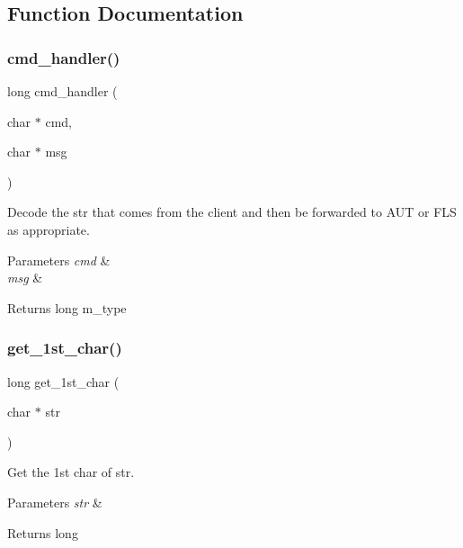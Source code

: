 \subsection{Function Documentation}
\mbox{\label{server_8c_a9fab57195d50c5f2b55f2744232ad64d}} 
\subsubsection{cmd\+\_\+handler()}
{\footnotesize\ttfamily long cmd\+\_\+handler (\begin{DoxyParamCaption}\item[{char $\ast$}]{cmd,  }\item[{char $\ast$}]{msg }\end{DoxyParamCaption})}



Decode the str that comes from the client and then be forwarded to A\+UT or F\+LS as appropriate. 


\begin{DoxyParams}{Parameters}
{\em cmd} & \\
\hline
{\em msg} & \\
\hline
\end{DoxyParams}
\begin{DoxyReturn}{Returns}
long m\+\_\+type 
\end{DoxyReturn}
\mbox{\label{server_8c_a224345045f1250d5768d42d8cc9e3dab}} 
\subsubsection{get\+\_\+1st\+\_\+char()}
{\footnotesize\ttfamily long get\+\_\+1st\+\_\+char (\begin{DoxyParamCaption}\item[{char $\ast$}]{str }\end{DoxyParamCaption})}



Get the 1st char of str. 


\begin{DoxyParams}{Parameters}
{\em str} & \\
\hline
\end{DoxyParams}
\begin{DoxyReturn}{Returns}
long 
\end{DoxyReturn}
\mbox{\label{server_8c_a7c71d69d21fd5c82ce5af6aee230d25e}} 
